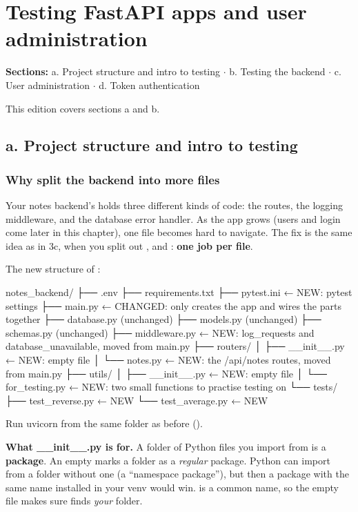 \chapter{Testing FastAPI apps and user administration}

\textbf{Sections:} a. Project structure and intro to testing $\cdot$ b. Testing the backend $\cdot$ c. User administration $\cdot$ d. Token authentication

This edition covers sections a and b.

\section{a. Project structure and intro to testing}

\subsection{Why split the backend into more files}

Your notes backend's  holds three different kinds of code: the routes, the logging middleware, and the database error handler. As the app grows (users and login come later in this chapter), one file becomes hard to navigate. The fix is the same idea as in 3c, when you split out ,  and : \textbf{one job per file}.

The new structure of :

\begin{code}
notes_backend/
├── .env
├── requirements.txt
├── pytest.ini          ← NEW: pytest settings
├── main.py             ← CHANGED: only creates the app and wires the parts together
├── database.py         (unchanged)
├── models.py           (unchanged)
├── schemas.py          (unchanged)
├── middleware.py       ← NEW: log_requests and database_unavailable, moved from main.py
├── routers/
│   ├── __init__.py     ← NEW: empty file
│   └── notes.py        ← NEW: the /api/notes routes, moved from main.py
├── utils/
│   ├── __init__.py     ← NEW: empty file
│   └── for_testing.py  ← NEW: two small functions to practise testing on
└── tests/
    ├── test_reverse.py ← NEW
    └── test_average.py ← NEW
\end{code}

Run uvicorn from the same folder as before ().

\textbf{What \_\_init\_\_.py is for.} A folder of Python files you import from is a \textbf{package}. An empty  marks a folder as a \emph{regular} package. Python can import from a folder without one (a ``namespace package''), but then a package with the same name installed in your venv would win.  is a common name, so the empty file makes sure  finds \emph{your} folder.

